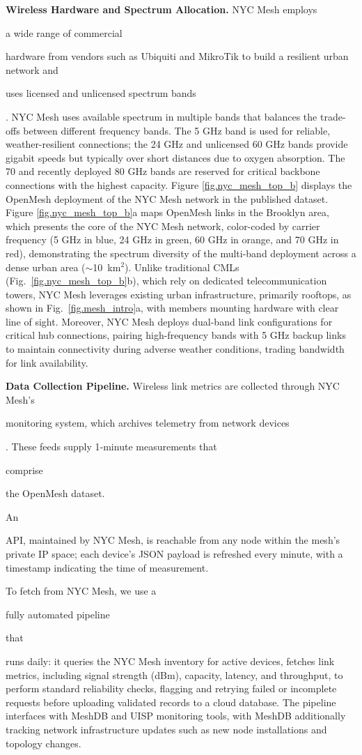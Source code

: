 \documentclass[manuscript]{copernicus}
\newif\ifshowrevisions
\newcommand{\blue}[1]{%
  \ifshowrevisions
    \textcolor{black}{#1}%
  \else
    #1%
  \fi
}
\begin{document}
\noindent \textbf{Wireless Hardware and Spectrum Allocation.}
NYC Mesh employs \blue{a wide range of commercial} hardware from vendors such as Ubiquiti and MikroTik to build a resilient urban network and \blue{uses licensed and unlicensed spectrum bands}.
NYC Mesh uses available spectrum in multiple bands that balances the trade-offs between different frequency bands.
The 5 GHz band is used for reliable, weather-resilient connections; the 24 GHz and unlicensed 60 GHz bands provide gigabit speeds but typically over short distances due to oxygen absorption. The 70 and recently deployed 80 GHz bands are reserved for critical backbone connections with the highest capacity.
Figure \ref{fig.nyc_mesh_top_b} displays the OpenMesh deployment of the NYC Mesh network in the published dataset. 
Figure \ref{fig.nyc_mesh_top_b}a maps OpenMesh links in the Brooklyn area, which presents the core of the NYC Mesh network, color-coded by carrier frequency (5 GHz in blue, 24 GHz in green, 60 GHz in orange, and 70 GHz in red), demonstrating the spectrum diversity of the multi-band deployment across a dense urban area ($\sim$10~km$^2$).
Unlike traditional CMLs (Fig.~\ref{fig.nyc_mesh_top_b}b), which rely on dedicated telecommunication towers, NYC Mesh leverages existing urban infrastructure, primarily rooftops, as shown in Fig.~\ref{fig.mesh_intro}a, with members mounting hardware with clear line of sight.
Moreover, NYC Mesh deploys dual-band link configurations for critical hub connections, pairing high-frequency bands with 5 GHz backup links to maintain connectivity during adverse weather conditions, trading bandwidth for link availability.



\noindent \textbf{Data Collection Pipeline.}\label{sec:network-hardware}
Wireless link metrics are collected through NYC Mesh's \blue{monitoring system, which archives telemetry from network devices}. These feeds supply 1‑minute measurements that \blue{comprise} the OpenMesh dataset.
\blue{An} API, maintained by NYC Mesh, is reachable from any node within the mesh's private IP space; each device's JSON payload is refreshed every minute, with a timestamp indicating the time of measurement.
\blue{To fetch from NYC Mesh, we use a} fully automated pipeline \blue{that} runs daily: it queries the NYC Mesh inventory for active devices, fetches link metrics, including signal strength (dBm), capacity, latency, and throughput, to perform standard reliability checks, flagging and retrying failed or incomplete requests before uploading validated records to a cloud database.
The pipeline interfaces with MeshDB and UISP monitoring tools, with MeshDB additionally tracking network infrastructure updates such as new node installations and topology changes.
\end{document}
